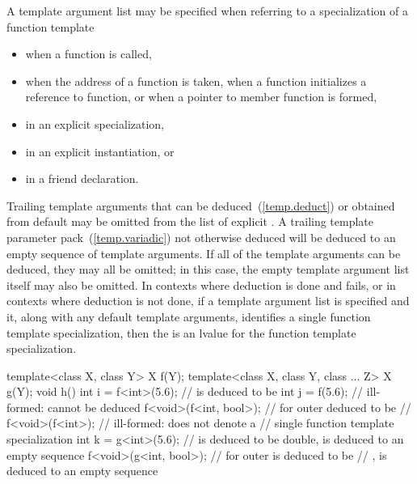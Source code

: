 \pnum
A template argument list may be specified when referring to a specialization
of a function template

\begin{itemize}
\item
when a function is called,
\item
when the address of a function is taken, when a function initializes a
reference to function, or when a pointer to member function is formed,
\item
in an explicit specialization,
\item
in an explicit instantiation, or
\item
in a friend declaration.
\end{itemize}

\pnum
Trailing template arguments that can be deduced~(\ref{temp.deduct}) or
obtained from default
may be omitted from the list of explicit
.
A trailing template parameter pack~(\ref{temp.variadic}) not otherwise deduced will be
deduced to an empty sequence of template arguments.
If all of the template arguments can be deduced, they may all be omitted;
in this case, the empty template argument list
\tcode{<>}
itself may also be omitted.
In contexts where deduction is done and fails, or in contexts where
deduction is not done, if a template argument list is specified and it,
along with any default template arguments, identifies a single function
template specialization, then the
is an lvalue for the function template specialization.
\begin{example}

\begin{codeblock}
template<class X, class Y> X f(Y);
template<class X, class Y, class ... Z> X g(Y);
void h() {
  int i = f<int>(5.6);          //  is deduced to be 
  int j = f(5.6);               // ill-formed:  cannot be deduced
  f<void>(f<int, bool>);        //  for outer  deduced to be
                                // 
  f<void>(f<int>);              // ill-formed:  does not denote a
                                // single function template specialization
  int k = g<int>(5.6);          //  is deduced to be double,  is deduced to an empty sequence
  f<void>(g<int, bool>);        //  for outer  is deduced to be
                                // ,  is deduced to an empty sequence
}
\end{codeblock}
\end{example}

